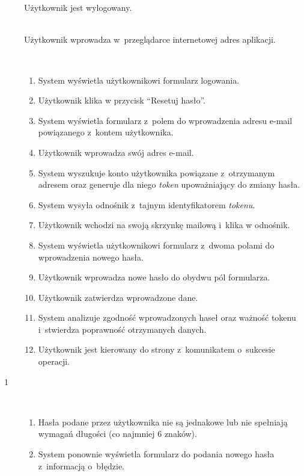 \documentclass[11pt]{aghdpl}
\begin{document}
	\begin{description}
		\item[\useCaseAktor] \hfill \\
			\useCaseUzytkownik
		\item[\useCaseWarPocz] \hfill \\
			Użytkownik jest wylogowany.
		\item[\useCaseZdarzInicj] \hfill \\
			Użytkownik wprowadza w~przeglądarce internetowej adres aplikacji.
		\item[\useCaseScenBaz] \hfill \\ 
			\begin{enumerate}
			\item System wyświetla użytkownikowi formularz logowania.
			\item Użytkownik klika w przycisk ``Resetuj hasło''.
			\item System wyświetla formularz z~polem do wprowadzenia adresu e-mail powiązanego z~kontem użytkownika.
			\item Użytkownik wprowadza swój adres e-mail.
			\item System wyszukuje konto użytkownika powiązane z~otrzymanym adresem oraz generuje dla niego \emph{token} upoważniający do zmiany hasła.
			\item System wysyła odnośnik z~tajnym identyfikatorem \emph{tokenu}.
			\item Użytkownik wchodzi na swoją skrzynkę mailową i~klika w odnośnik.
			\item System wyświetla użytkownikowi formularz z~dwoma polami do wprowadzenia nowego hasła.
			\item Użytkownik wprowadza nowe hasło do obydwu pól formularza.
			\item Użytkownik zatwierdza wprowadzone dane.
			\item System analizuje zgodność wprowadzonych haseł oraz ważność tokenu i~stwierdza poprawność otrzymanych danych.
			\item Użytkownik jest kierowany do strony z~komunikatem o~sukcesie operacji.
			\end{enumerate}
		\item[\useCaseScenAlt~1] \hfill \\
			\begin{enumerate}[label=11a\arabic*.]
			\item Hasła podane przez użytkownika nie są jednakowe lub nie spełniają wymagań długości (co najmniej 6 znaków).
			\item System ponownie wyświetla formularz do podania nowego hasła z~informacją o~błędzie.

\end{enumerate}
\end{description}
\end{document}
